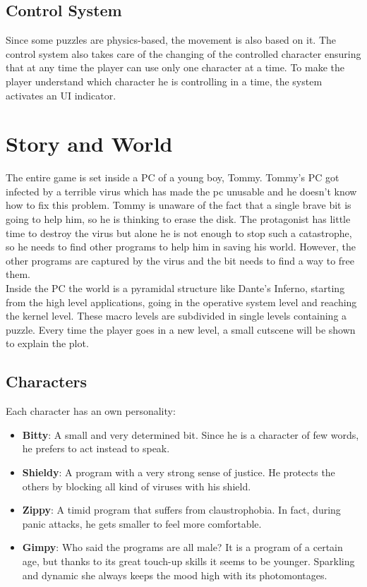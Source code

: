 \documentclass[12pt, a4paper]{report}
\begin{document}
\section*{Control System}
Since some puzzles are physics-based, the movement is also based on it. The control system also takes care of the changing of the controlled character ensuring that at any time the player can use only one character at a time. To make the player understand which character he is controlling in a time, the system activates an UI indicator.



\chapter{Story and World}
The entire game is set inside a PC of a young boy, Tommy. Tommy’s PC got infected by a terrible virus which has made the pc unusable and he doesn’t know how to fix this problem. Tommy is unaware of the fact that a single brave bit is going to help him, so he is thinking to erase the disk. The protagonist has little time to destroy the virus but alone he is not enough to stop such a catastrophe, so he needs to find other programs to help him in saving his world. However, the other programs are captured by the virus and the bit needs to find a way to free them.\\
Inside the PC the world is a pyramidal structure like Dante’s Inferno, starting from the high level applications, going in the operative system level and reaching the kernel level. These macro levels are subdivided in single levels containing a puzzle.  Every time the player goes in a new level, a small cutscene will be shown to explain the plot.

\section*{Characters}
Each character has an own personality:
\begin{itemize}
\item \textbf{Bitty}: A small and very determined bit. Since he is a character of few words, he prefers to act instead to speak.
\item \textbf{Shieldy}: A program with a very strong sense of justice. He protects the others by blocking all kind of viruses with his shield.
\item \textbf{Zippy}: A timid program that suffers from claustrophobia. In fact, during panic attacks, he gets smaller to feel more comfortable.
\item \textbf{Gimpy}: Who said the programs are all male? It is a program of a certain age, but thanks to its great touch-up skills it seems to be younger. Sparkling and dynamic she always keeps the mood high with its photomontages.
\end{itemize}
\end{document}
